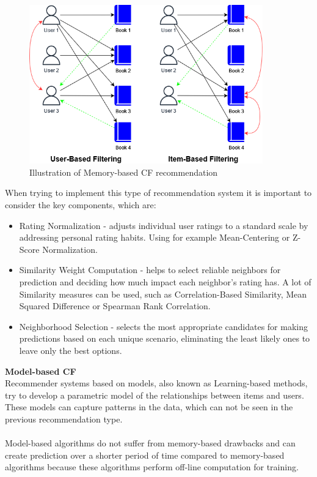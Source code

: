 \documentclass[\myFontSize,a4paper,oneside,english,hidelinks]{article}
\begin{document}
\begin{figure}[h!]
    \centering
    \includegraphics[width=0.9\textwidth]{img/collaborative_example.png}
    \caption{Illustration of Memory-based CF recommendation}
    \label{fig:collaborative_example}
\end{figure}
%
%
When trying to implement this type of recommendation system it is important to consider the key components, which are: 
\begin{itemize}
\item Rating Normalization - adjusts individual user ratings to a standard scale by addressing personal rating habits. Using for example Mean-Centering or Z-Score Normalization. 
\item Similarity Weight Computation - helps to select reliable neighbors for prediction and deciding how much impact each neighbor's rating has. A lot of Similarity measures can be used, such as Correlation-Based Similarity, Mean Squared Difference or Spearman Rank Correlation. 
\item Neighborhood Selection - selects the most appropriate candidates for making predictions based on each unique scenario, eliminating the least likely ones to leave only the best options. \cite{Ning201537}
\end{itemize}
%
%
\textbf{Model-based CF}\\
Recommender systems based on models, also known as Learning-based methods, try to develop a parametric model of the relationships between items and users. These models can capture patterns in the data, which can not be seen in the previous recommendation type. \\\\
Model-based algorithms do not suffer from memory-based drawbacks and can create prediction over a shorter period of time compared to memory-based algorithms because these algorithms perform off-line computation for training. 
\end{document}

